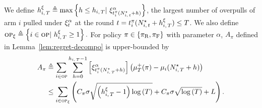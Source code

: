 \begin{lemma}
\label{lem:rested-A}
We define $\hiT^\xi \triangleq \max\left\{ h \leq \hiT | \ \xi^\alpha_{t_i^{\pi}(\Nit^\star + h)}\right\}$, the largest number of overpulls of arm $i$ pulled under $\xi^\alpha_t$ at the round $t = t_i^{\pi}(N_{i,\,t}^\star + h_{i,\,T}^\xi) \leq T$. We also define $\textsc{op}_\xi \triangleq \left\{ i \in \textsc{op} | \  h_{i,\,T}^\xi \geq 1 \right\}.$ For policy $\pi \in \left\{ \pi_{\rm R}, \pi_{\rm F}\right\}$ with parameter $\alpha$, $A_{\pi}$ defined in Lemma~\ref{lem:regret-decompo} is upper-bounded by
\begin{align*}
A_{\pi} &\triangleq  \sum_{i\in \textsc{op}}   \sum_{h=0}^{h_{i,\,T}-1}  \left[ \xi^\alpha_{t_i^{\pi}(N_{i,\,T}^\star + h) }\right] \left(\mu^+_T(\pi) - \mu_i(N_{i,\,T}^{\star} + h)\right) \\
& \leq \sum_{i\in \textsc{op}_\xi} \left(C_\pi \sigma \sqrt{\left(h_{i,\,T}^\xi -1\right)\log\left(T\right)} +C_\pi \sigma\sqrt{\log{\left(T\right)}}+  L\right).
\end{align*}
\end{lemma}
